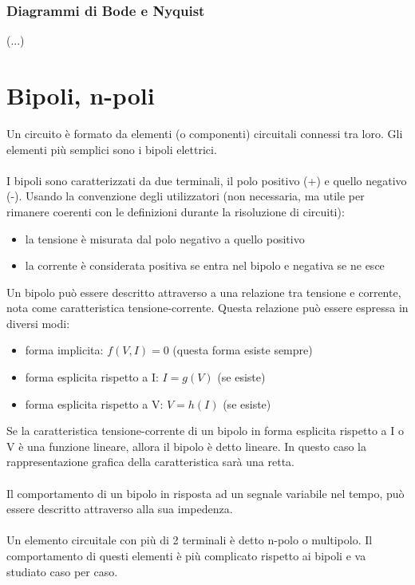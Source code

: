\documentclass{article}
\begin{document}
\subsubsection{Diagrammi di Bode e Nyquist}
(...)












\newpage
\section{Bipoli, n-poli}
Un circuito è formato da elementi (o componenti) circuitali connessi tra loro. Gli elementi più semplici sono i bipoli elettrici.\\\\
I bipoli sono caratterizzati da due terminali, il polo positivo (+) e quello negativo (-). Usando la convenzione degli utilizzatori (non necessaria, ma utile per rimanere coerenti con le definizioni durante la risoluzione di circuiti):
\begin{itemize}
    \item la tensione è misurata dal polo negativo a quello positivo
    \item la corrente è considerata positiva se entra nel bipolo e negativa se ne esce
\end{itemize}
Un bipolo può essere descritto attraverso a una relazione tra tensione e corrente, nota come caratteristica tensione-corrente. Questa relazione può essere espressa in diversi modi:
\begin{itemize}
    \item forma implicita: $f(V,I)=0$ (questa forma esiste sempre)
    \item forma esplicita rispetto a I: $I=g(V)$ (se esiste)
    \item forma esplicita rispetto a V: $V=h(I)$ (se esiste)
\end{itemize}
Se la caratteristica tensione-corrente di un bipolo in forma esplicita rispetto a I o V è una funzione lineare, allora il bipolo è detto lineare. In questo caso la rappresentazione grafica della caratteristica sarà una retta.\\\\
Il comportamento di un bipolo in risposta ad un segnale variabile nel tempo, può essere descritto attraverso alla sua impedenza.\\\\
Un elemento circuitale con più di 2 terminali è detto n-polo o multipolo. Il comportamento di questi elementi è più complicato rispetto ai bipoli e va studiato caso per caso.
\end{document}
